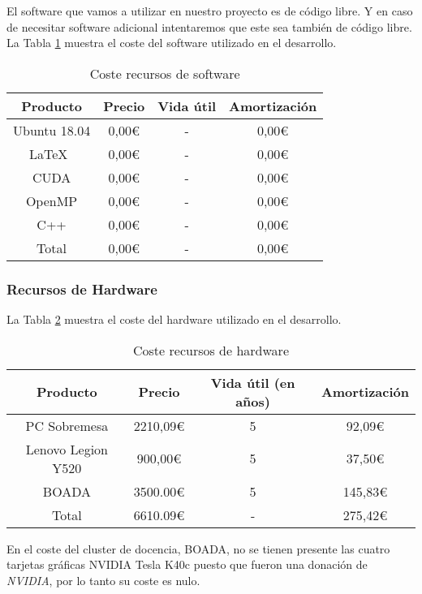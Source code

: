 \documentclass[titlepage,10.5pt]{report}
\begin{document}
El software que vamos a utilizar en nuestro proyecto es de código libre. Y en caso de necesitar software adicional intentaremos que este sea también de código libre. La Tabla \ref{soft} muestra el coste del software utilizado en el desarrollo.

\begin{table}[H]
	\centering
	\begin{tabular}{|c|c|c|c|}
		\hline
		\textbf{Producto} & \textbf{Precio} & \textbf{Vida útil} & \textbf{Amortización} \\ \hline \hline
		Ubuntu 18.04 	& 0,00€ & - & 0,00€ \\ \hline
		\LaTeX\ 		& 0,00€ & - & 0,00€ \\ \hline
		CUDA 			& 0,00€ & - & 0,00€ \\ \hline
		OpenMP 			& 0,00€ & - & 0,00€ \\ \hline
		C++ 			& 0,00€ & - & 0,00€ \\ \hline	\hline
		Total 			& 0,00€ & - & 0,00€ \\ \hline
	\end{tabular}
	\caption{Coste recursos de software}
	\label{soft}
\end{table}

\subsubsection{Recursos de Hardware}

La Tabla \ref{hard} muestra el coste del hardware utilizado en el desarrollo.

\begin{table}[H]
	\centering
	\begin{tabular}{|c|c|c|c|}
		\hline
		\textbf{Producto} 	& \textbf{Precio} & \textbf{Vida útil (en años)} & \textbf{Amortización} \\ \hline \hline
		PC Sobremesa 		& 2210,09€ & 5 &  92,09€\\ \hline
		Lenovo Legion Y520 	&  900,00€ & 5 &  37,50€ \\ \hline
		BOADA 				& 3500.00€ & 5 & 145,83€ \\ \hline \hline	
		Total 				& 6610.09€ & - & 275,42€ \\ \hline
	\end{tabular}
	\caption{Coste recursos de hardware}
	\label{hard}
\end{table}

En el coste del cluster de docencia, BOADA, no se tienen presente las cuatro tarjetas gráficas NVIDIA Tesla K40c puesto que fueron una donación de \textit{NVIDIA}, por lo tanto su coste es nulo.
\end{document}
